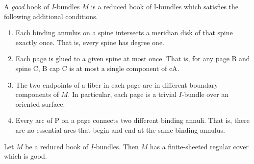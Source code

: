 \begin{defn}

A \emph{good} book of $I$-bundles $M$ is a reduced book of I-bundles which
satisfies the following additional conditions.

\begin{enumerate}

\item Each binding annulus on a spine intersects a meridian disk of that spine
exactly once. That is, every spine has degree one.

\item Each page is glued to a given spine at most once. That is, for any page
B and spine C, B cap C is at most a single component of cA.

\item The two endpoints of a fiber in each page are in different boundary
components of $M$. In particular, each page is a trivial $I$-bundle over an
oriented surface.

\item Every arc of P on a page connects two different binding annuli. That is,
there are no essential arcs that begin and end at the same binding annulus.

\end{enumerate}

\end{defn}

\begin{lemma}

Let $M$ be a reduced book of $I$-bundles. Then $M$ has a finite-sheeted regular
cover which is good.

\end{lemma}

